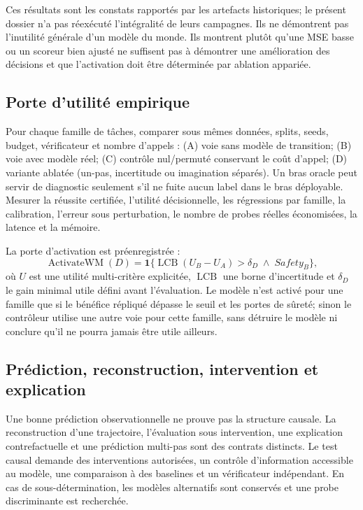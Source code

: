 \documentclass[11pt,a4paper]{article}
\begin{document}
Ces résultats sont les constats rapportés par les artefacts historiques; le présent dossier n'a pas réexécuté l'intégralité de leurs campagnes. Ils ne démontrent pas l'inutilité générale d'un modèle du monde. Ils montrent plutôt qu'une MSE basse ou un scoreur bien ajusté ne suffisent pas à démontrer une amélioration des décisions et que l'activation doit être déterminée par ablation appariée.

\subsection{Porte d'utilité empirique}
Pour chaque famille de tâches, comparer sous mêmes données, splits, seeds, budget, vérificateur et nombre d'appels : (A) voie sans modèle de transition; (B) voie avec modèle réel; (C) contrôle nul/permuté conservant le coût d'appel; (D) variante ablatée (un-pas, incertitude ou imagination séparés). Un bras oracle peut servir de diagnostic seulement s'il ne fuite aucun label dans le bras déployable. Mesurer la réussite certifiée, l'utilité décisionnelle, les régressions par famille, la calibration, l'erreur sous perturbation, le nombre de probes réelles économisées, la latence et la mémoire.

La porte d'activation est préenregistrée :
\[
\operatorname{ActivateWM}(D)=\mathbf{1}\{\operatorname{LCB}(U_B-U_A)>\delta_D\;\land\;Safety_B\},
\]
où \(U\) est une utilité multi-critère explicitée, \(\operatorname{LCB}\) une borne d'incertitude et \(\delta_D\) le gain minimal utile défini avant l'évaluation. Le modèle n'est activé pour une famille que si le bénéfice répliqué dépasse le seuil et les portes de sûreté; sinon le contrôleur utilise une autre voie pour cette famille, sans détruire le modèle ni conclure qu'il ne pourra jamais être utile ailleurs.

\subsection{Prédiction, reconstruction, intervention et explication}
Une bonne prédiction observationnelle ne prouve pas la structure causale. La reconstruction d'une trajectoire, l'évaluation sous intervention, une explication contrefactuelle et une prédiction multi-pas sont des contrats distincts. Le test causal demande des interventions autorisées, un contrôle d'information accessible au modèle, une comparaison à des baselines et un vérificateur indépendant. En cas de sous-détermination, les modèles alternatifs sont conservés et une probe discriminante est recherchée.
\end{document}
